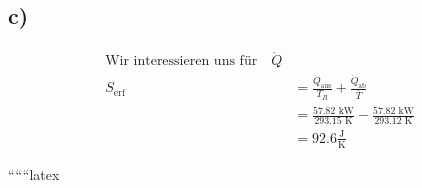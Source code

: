 

\subsection*{c)}


\begin{align*}
\text{Wir interessieren uns für} \quad \dot{Q} \\
S_{\text{erf}} &= \frac{\dot{Q}_{\text{aus}}}{T_R} + \frac{\dot{Q}_{\text{ab}}}{\overline{T}} \\
&= \frac{57.82 \text{ kW}}{293.15 \text{ K}} - \frac{57.82 \text{ kW}}{293.12 \text{ K}} \\
&= 92.6 \frac{\text{J}}{\text{K}}
\end{align*}

``````latex